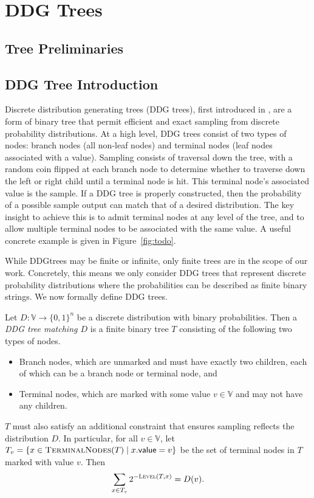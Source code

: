 \section{DDG Trees} \label{sec:ddg-trees}

\subsection{Tree Preliminaries}

\subsection{DDG Tree Introduction}

Discrete distribution generating trees (DDG trees), first introduced in \cite{ALGCPLX:KnuYao76}, are a form of binary tree that permit efficient and exact sampling from discrete probability distributions.
At a high level, DDG trees consist of two types of nodes: branch nodes (all non-leaf nodes) and terminal nodes (leaf nodes associated with a value). 
Sampling consists of traversal down the tree, with a random coin flipped at each branch node to determine whether to traverse down the left or right child until a terminal node is hit.
This terminal node's associated value is the sample.
If a DDG tree is properly constructed, then the probability of a possible sample output can match that of a desired distribution. 
The key insight to achieve this is to admit terminal nodes at any level of the tree, and to allow multiple terminal nodes to be associated with the same value.
A useful concrete example is given in Figure~\ref{fig:todo}.

While DDGtrees may be finite or infinite, only finite trees are in the scope of our work.
Concretely, this means we only consider DDG trees that represent discrete probability distributions where the probabilities can be described as finite binary strings. 
We now formally define DDG trees.

\begin{definition}
Let $D:\mathbb{V} \to \{0, 1\}^n$ be a discrete distribution with binary probabilities. Then a \emph{DDG tree matching $D$} is a finite binary tree $T$ consisting of the following two types of nodes.
\begin{itemize}
	\item Branch nodes, which are unmarked and must have exactly two children, each of which can be a branch node or terminal node, and
	\item Terminal nodes, which are marked with some value $v \in \mathbb{V}$ and may not have any children.
\end{itemize}
$T$ must also satisfy an additional constraint that ensures sampling reflects the distribution $D$. In particular, for all $v \in \mathbb{V}$, let $T_v = \{ x \in \textsc{TerminalNodes}(T) \mid x.\mathsf{value} = v\}$ be the set of terminal nodes in $T$ marked with value $v$. Then
$$ \sum_{x \in T_v} 2^{-\textsc{Level}(T, x)} = D(v).$$
\end{definition}